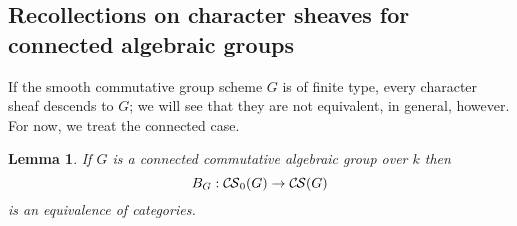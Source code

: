 \documentclass[10pt]{amsart}
\theoremstyle{plain}
\newtheorem{lemma}[theorem]{Lemma}
\theoremstyle{definition}
\newcommand{\Fq}{k}
\newcommand{\CS}{{\mathcal{C\hskip-0.8pt S}}}
\newcommand{\bCS}{{\CS_0}}
\begin{document}
\subsection{Recollections on character sheaves for connected algebraic groups}\label{ssec:connected}


If the smooth commutative group scheme $G$ is of finite type, every character sheaf descends to $G$;
we will see that they are not equivalent, in general, however.
For now, we treat the connected case.

\begin{lemma}\label{lem:bounded_connected}
If $G$ is a connected commutative algebraic group over $\Fq$ then 
\[
B_G : \bCS(G) \to \CS(G)
\]
 is an equivalence of categories.
\end{lemma}
\end{document}
